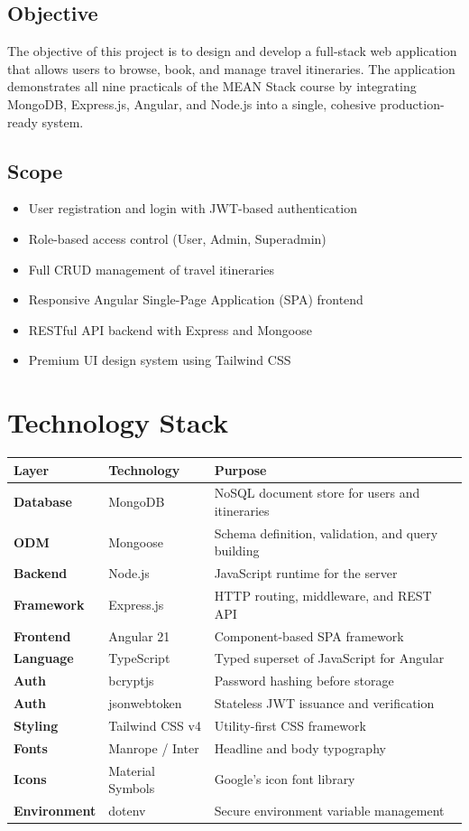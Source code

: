 \documentclass[12pt,a4paper]{article}
\begin{document}
\subsection{Objective}
The objective of this project is to design and develop a full-stack web application that allows users to browse, book, and manage travel itineraries. The application demonstrates all nine practicals of the MEAN Stack course by integrating MongoDB, Express.js, Angular, and Node.js into a single, cohesive production-ready system.

\subsection{Scope}
\begin{itemize}
    \item User registration and login with JWT-based authentication
    \item Role-based access control (User, Admin, Superadmin)
    \item Full CRUD management of travel itineraries
    \item Responsive Angular Single-Page Application (SPA) frontend
    \item RESTful API backend with Express and Mongoose
    \item Premium UI design system using Tailwind CSS
\end{itemize}

\section{Technology Stack}

\begin{longtable}{>{\bfseries}p{3.5cm} p{4cm} p{6cm}}
\toprule
Layer & Technology & Purpose \\
\midrule
\endhead
Database & MongoDB & NoSQL document store for users and itineraries \\
ODM & Mongoose & Schema definition, validation, and query building \\
Backend & Node.js & JavaScript runtime for the server \\
Framework & Express.js & HTTP routing, middleware, and REST API \\
Frontend & Angular 21 & Component-based SPA framework \\
Language & TypeScript & Typed superset of JavaScript for Angular \\
Auth & bcryptjs & Password hashing before storage \\
Auth & jsonwebtoken & Stateless JWT issuance and verification \\
Styling & Tailwind CSS v4 & Utility-first CSS framework \\
Fonts & Manrope / Inter & Headline and body typography \\
Icons & Material Symbols & Google's icon font library \\
Environment & dotenv & Secure environment variable management \\
\bottomrule
\end{longtable}
\end{document}
